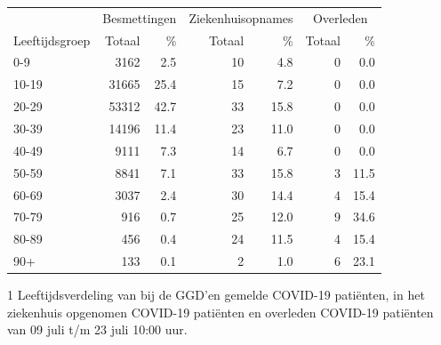 \documentclass[
  english,
  man,floatsintext]{apa6}
\begin{document}
\begin{table}
\centering\begingroup\fontsize{11}{13}\selectfont

\begin{threeparttable}
\begin{tabular}{lrrrrrr}
\toprule
\multicolumn{1}{c}{ } & \multicolumn{2}{c}{Besmettingen} & \multicolumn{2}{c}{Ziekenhuisopnames} & \multicolumn{2}{c}{Overleden} \\
\cmidrule(l{3pt}r{3pt}){2-3} \cmidrule(l{3pt}r{3pt}){4-5} \cmidrule(l{3pt}r{3pt}){6-7}
Leeftijdsgroep & Totaal & \% & Totaal & \% & Totaal & \%\\
\midrule
0-9 & 3162 & 2.5 & 10 & 4.8 & 0 & 0.0\\
10-19 & 31665 & 25.4 & 15 & 7.2 & 0 & 0.0\\
20-29 & 53312 & 42.7 & 33 & 15.8 & 0 & 0.0\\
30-39 & 14196 & 11.4 & 23 & 11.0 & 0 & 0.0\\
40-49 & 9111 & 7.3 & 14 & 6.7 & 0 & 0.0\\
50-59 & 8841 & 7.1 & 33 & 15.8 & 3 & 11.5\\
60-69 & 3037 & 2.4 & 30 & 14.4 & 4 & 15.4\\
70-79 & 916 & 0.7 & 25 & 12.0 & 9 & 34.6\\
80-89 & 456 & 0.4 & 24 & 11.5 & 4 & 15.4\\
90+ & 133 & 0.1 & 2 & 1.0 & 6 & 23.1\\
\bottomrule
\end{tabular}
\begin{tablenotes}
\item[1] Leeftijdsverdeling van bij de GGD’en gemelde COVID-19 patiënten, in het ziekenhuis opgenomen COVID-19 patiënten en overleden COVID-19 patiënten van 09 juli t/m 23 juli 10:00 uur.
\end{tablenotes}
\end{threeparttable}
\endgroup{}
\end{table}

\newpage
\end{document}
